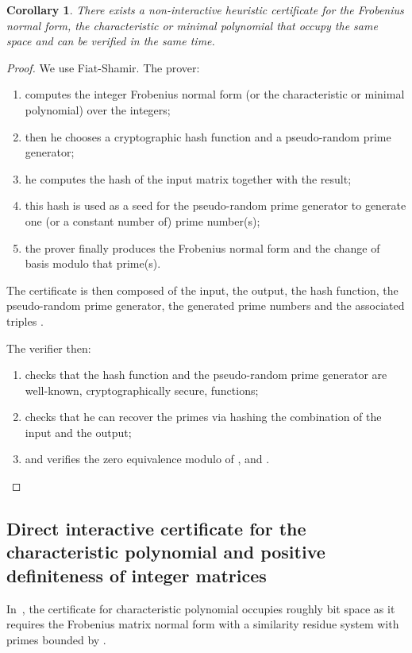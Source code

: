 \documentclass{article}
\newtheorem{corollary}{Corollary}
\begin{document}
\begin{corollary} There exists a {\em non-interactive heuristic certificate} for
  the Frobenius normal form, the characteristic or minimal polynomial that
  occupy the same space and can be verified in the same time.
\end{corollary}
\begin{proof} We use Fiat-Shamir. The prover:
  \begin{enumerate}
  \item
  computes the integer Frobenius normal form  (or the characteristic or
  minimal polynomial) over the integers;
  \item 
  then he chooses a cryptographic hash function and a pseudo-random prime 
  generator; 
  \item 
  he computes the hash of the input matrix together with the result;
  \item 
  this hash is used as a seed for the pseudo-random prime generator to
  generate one (or a constant number of) prime number(s);
  \item 
  the prover finally produces the Frobenius normal form and the change of basis
  modulo that prime(s).
  \end{enumerate}
  The certificate is then composed of the input, the output, the hash function,
  the pseudo-random prime generator, the generated prime numbers and the
  associated triples .

  The verifier then:
  \begin{enumerate}
  \item checks that the hash function and the pseudo-random prime generator
    are well-known, cryptographically secure, functions;
  \item checks that he can recover the primes via hashing the combination of the
    input and the output;
  \item and verifies the zero equivalence modulo  of ,
     and .
  \end{enumerate}
\end{proof}

\subsection{Direct interactive certificate for the
  characteristic polynomial and positive definiteness of integer
  matrices}\label{ssec:charpoly}
In~\cite{Kaltofen:2011:quadcert}, the certificate for characteristic
polynomial occupies roughly  bit space as it requires the
Frobenius matrix normal form with a similarity residue system with primes
bounded by .
\end{document}
